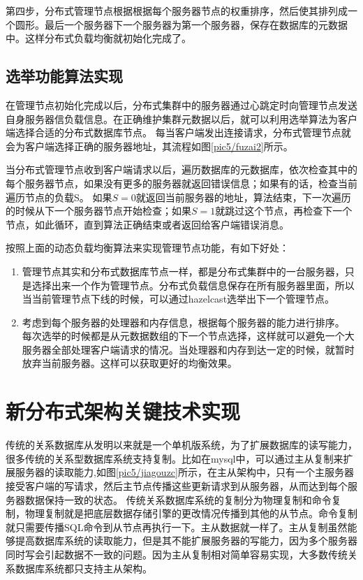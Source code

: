 第四步，分布式管理节点根据根据每个服务器节点的权重排序，然后使其排列成一个圆形。最后一个服务器下一个服务器为第一个服务器，保存在数据库的元数据中。这样分布式负载均衡就初始化完成了。
\subsection{选举功能算法实现}
在管理节点初始化完成以后，分布式集群中的服务器通过心跳定时向管理节点发送自身服务器信负载信息。在正确维护集群元数据以后，就可以利用选举算法为客户端选择合适的分布式数据库节点。
每当客户端发出连接请求，分布式管理节点就会为客户端选择正确的服务器地址，其流程如图\ref{pic5/fuzai2}所示。

当分布式管理节点收到客户端请求以后，遍历数据库的元数据库，依次检查其中的每个服务器节点，如果没有更多的服务器就返回错误信息；如果有的话，检查当前遍历节点的负载S。
如果$ S=0 $就返回当前服务器的地址，算法结束，下一次遍历的时候从下一个服务器节点开始检查；如果$ S=1 $就跳过这个节点，再检查下一个节点，如此循环，直到算法正确结束或者返回给客户端错误消息。

按照上面的动态负载均衡算法来实现管理节点功能，有如下好处：
\begin{enumerate}
	\item 管理节点其实和分布式数据库节点一样，都是分布式集群中的一台服务器，只是选择出来一个作为管理节点。分布式负载信息保存在所有服务器里面，所以当当前管理节点下线的时候，可以通过hazelcast选举出下一个管理节点。
	\item 考虑到每个服务器的处理器和内存信息，根据每个服务器的能力进行排序。
	每次选举的时候都是从元数据数组的下一个节点选择，这样就可以避免一个大服务器全部处理客户端请求的情况。当处理器和内存到达一定的时候，就暂时放弃当前服务器。这样可以获取更好的均衡效果。
\end{enumerate}
\section{新分布式架构关键技术实现}
传统的关系数据库从发明以来就是一个单机版系统，为了扩展数据库的读写能力，很多传统的关系型数据库系统支持复制。比如在mysql中，可以通过主从复制来扩展服务器的读取能力,如图\ref{pic5/jiagouzc}所示，在主从架构中，只有一个主服务器接受客户端的写请求，然后主节点传播这些更新请求到从服务器，从而达到每个服务器数据保持一致的状态。
传统关系数据库系统的复制分为物理复制和命令复制，物理复制就是把底层数据存储引擎的更改情况传播到其他的从节点。命令复制就只需要传播SQL命令到从节点再执行一下。主从数据就一样了。主从复制虽然能够提高数据库系统的读取能力，但是其不能扩展服务器的写能力，因为多个服务器同时写会引起数据不一致的问题。因为主从复制相对简单容易实现，大多数传统关系数据库系统都只支持主从架构。

